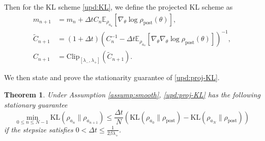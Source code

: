 \documentclass[11pt]{article}
\theoremstyle{plain}
\newtheorem{theorem}{Theorem}[section]
\theoremstyle{definition}
\theoremstyle{remark}
\newcommand{\E}{\mathbb{E}}
\newcommand{\KL}{\mathrm{KL}}
\newcommand{\post}{\mathrm{post}}
\newcommand{\Clip}{\mathrm{Clip}}
\begin{document}
Then for the KL scheme \eqref{upd:KL}, we define the projected KL scheme as 
\begin{equation}\label{upd:proj-KL}
    \begin{aligned}
        m_{n+1} &= m_n + \Delta t C_n \E_{\rho_{a_n}} [\nabla_\theta \log \rho_\post (\theta)], \\
        \widetilde{C}_{n+1} &= (1 + \Delta t) (C_n^{-1} - \Delta t \E_{\rho_{a_n}} [\nabla_\theta \nabla_\theta \log \rho_\post (\theta)])^{-1}, \\
        C_{n+1} &= \Clip_{[\lambda_-, \lambda_+]} (\widetilde{C}_{n+1}).
    \end{aligned}
\end{equation}

We then state and prove the stationarity guarantee of \eqref{upd:proj-KL}.

\begin{theorem}
    Under Assumption \ref{assump:smooth}, \eqref{upd:proj-KL} has the following stationary guarantee
    \begin{equation*}
        \min_{0 \leq n \leq N - 1} \KL (\rho_{a_n} \| \rho_{a_{n+1}}) \leq \frac{\Delta t}{N} (\KL (\rho_{a_0} \| \rho_\post) - \KL (\rho_{a_N} \| \rho_\post))
    \end{equation*}
    if the stepsize satisfies $0 < \Delta t \leq \frac{1}{2\beta \lambda_+}$.
\end{theorem}
\end{document}
